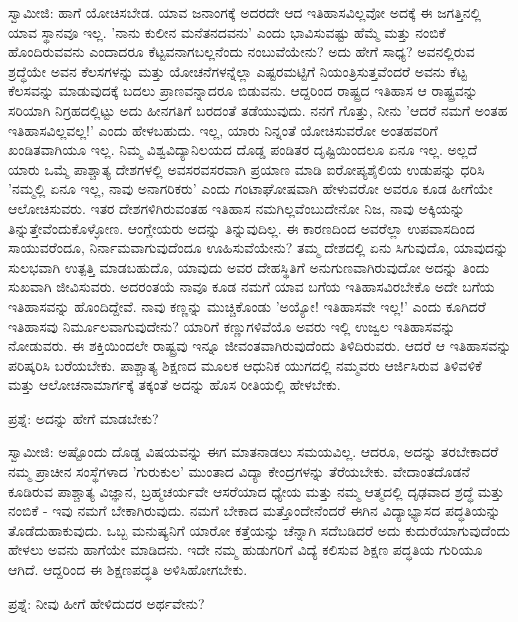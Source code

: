 ಸ್ವಾಮೀಜಿ: ಹಾಗೆ ಯೋಚಿಸಬೇಡ. ಯಾವ ಜನಾಂಗಕ್ಕೆ ಅದರದೇ ಆದ ಇತಿಹಾಸವಿಲ್ಲವೋ ಅದಕ್ಕೆ ಈ ಜಗತ್ತಿನಲ್ಲಿ ಯಾವ ಸ್ಥಾನವೂ ಇಲ್ಲ. 'ನಾನು ಕುಲೀನ ಮನೆತನದವನು' ಎಂದು ಭಾವಿಸುವಷ್ಟು ಹೆಮ್ಮೆ ಮತ್ತು ನಂಬಿಕೆ ಹೊಂದಿರುವವನು ಎಂದಾದರೂ ಕೆಟ್ಟವನಾಗಬಲ್ಲನೆಂದು ನಂಬುವೆಯೇನು? ಅದು ಹೇಗೆ ಸಾಧ್ಯ? ಅವನಲ್ಲಿರುವ ಶ್ರದ್ಧೆಯೇ ಅವನ ಕೆಲಸಗಳನ್ನು ಮತ್ತು ಯೋಚನೆಗಳನ್ನೆಲ್ಲಾ ಎಷ್ಟರಮಟ್ಟಿಗೆ ನಿಯಂತ್ರಿಸುತ್ತವೆಂದರೆ ಅವನು ಕೆಟ್ಟ ಕೆಲಸವನ್ನು ಮಾಡುವುದಕ್ಕೆ ಬದಲು ಪ್ರಾಣವನ್ನಾದರೂ ಬಿಡುವನು. ಆದ್ದರಿಂದ ರಾಷ್ಟ್ರದ ಇತಿಹಾಸ ಆ ರಾಷ್ಟ್ರವನ್ನು ಸರಿಯಾಗಿ ನಿಗ್ರಹದಲ್ಲಿಟ್ಟು ಅದು ಹೀನಗತಿಗೆ ಬರದಂತೆ ತಡೆಯುವುದು. ನನಗೆ ಗೊತ್ತು, ನೀನು 'ಆದರೆ ನಮಗೆ ಅಂತಹ ಇತಿಹಾಸವಿಲ್ಲವಲ್ಲ!' ಎಂದು ಹೇಳಬಹುದು. ಇಲ್ಲ, ಯಾರು ನಿನ್ನಂತೆ ಯೋಚಿಸುವರೋ ಅಂತಹವರಿಗೆ ಖಂಡಿತವಾಗಿಯೂ ಇಲ್ಲ. ನಿಮ್ಮ ವಿಶ್ವವಿದ್ಯಾನಿಲಯದ ದೊಡ್ಡ ಪಂಡಿತರ ದೃಷ್ಟಿಯಿಂದಲೂ ಏನೂ ಇಲ್ಲ. ಅಲ್ಲದೆ ಯಾರು ಒಮ್ಮೆ ಪಾಶ್ಚಾತ್ಯ ದೇಶಗಳಲ್ಲಿ ಅವಸರವಸರವಾಗಿ ಪ್ರಯಾಣ ಮಾಡಿ ಐರೋಪ್ಯಶೈಲಿಯ ಉಡುಪನ್ನು ಧರಿಸಿ 'ನಮ್ಮಲ್ಲಿ ಏನೂ ಇಲ್ಲ, ನಾವು ಅನಾಗರಿಕರು' ಎಂದು ಗಂಟಾಘೋಷವಾಗಿ ಹೇಳುವರೋ ಅವರೂ ಕೂಡ ಹೀಗೆಯೇ ಆಲೋಚಿಸುವರು. ಇತರ ದೇಶಗಳಿಗಿರುವಂತಹ ಇತಿಹಾಸ ನಮಗಿಲ್ಲವೆಂಬುದೇನೋ ನಿಜ, ನಾವು ಅಕ್ಕಿಯನ್ನು ತಿನ್ನುತ್ತೇವೆಂದುಕೊಳ್ಳೋಣ. ಆಂಗ್ಲೇಯರು ಅದನ್ನು ತಿನ್ನುವುದಿಲ್ಲ. ಈ ಕಾರಣದಿಂದ ಅವರೆಲ್ಲಾ ಉಪವಾಸದಿಂದ ಸಾಯುವರೆಂದೂ, ನಿರ್ನಾಮವಾಗುವುದೆಂದೂ ಊಹಿಸುವೆಯೇನು? ತಮ್ಮ ದೇಶದಲ್ಲಿ ಏನು ಸಿಗುವುದೊ, ಯಾವುದನ್ನು ಸುಲಭವಾಗಿ ಉತ್ಪತ್ತಿ ಮಾಡಬಹುದೊ, ಯಾವುದು ಅವರ ದೇಹಸ್ಥಿತಿಗೆ ಅನುಗುಣವಾಗಿರುವುದೋ ಅದನ್ನು ತಿಂದು ಸುಖವಾಗಿ ಜೀವಿಸುವರು. ಅದರಂತಯೆ ನಾವೂ ಕೂಡ ನಮಗೆ ಯಾವ ಬಗೆಯ ಇತಿಹಾಸವಿರಬೇಕೊ ಅದೇ ಬಗೆಯ ಇತಿಹಾಸವನ್ನು ಹೊಂದಿದ್ದೇವೆ. ನಾವು ಕಣ್ಣನ್ನು ಮುಚ್ಚಿಕೊಂಡು 'ಅಯ್ಯೋ! ಇತಿಹಾಸವೇ ಇಲ್ಲ!' ಎಂದು ಕೂಗಿದರೆ ಇತಿಹಾಸವು ನಿರ್ಮೂಲವಾಗುವುದೇನು? ಯಾರಿಗೆ ಕಣ್ಣುಗಳಿವೆಯೊ ಅವರು ಇಲ್ಲಿ ಉಜ್ವಲ ಇತಿಹಾಸವನ್ನು ನೋಡುವರು. ಈ ಶಕ್ತಿಯಿಂದಲೇ ರಾಷ್ಟ್ರವು ಇನ್ನೂ ಜೀವಂತವಾಗಿರುವುದೆಂದು ತಿಳಿದಿರುವರು. ಆದರೆ ಆ ಇತಿಹಾಸವನ್ನು ಪರಿಷ್ಕರಿಸಿ ಬರೆಯಬೇಕು. ಪಾಶ್ಚಾತ್ಯ ಶಿಕ್ಷಣದ ಮೂಲಕ ಆಧುನಿಕ ಯುಗದಲ್ಲಿ ನಮ್ಮವರು ಆರ್ಜಿಸಿರುವ ತಿಳಿವಳಿಕೆ ಮತ್ತು ಆಲೋಚನಾಮಾರ್ಗಕ್ಕೆ ತಕ್ಕಂತೆ ಅದನ್ನು ಹೊಸ ರೀತಿಯಲ್ಲಿ ಹೇಳಬೇಕು.

ಪ್ರಶ್ನೆ: ಅದನ್ನು ಹೇಗೆ ಮಾಡಬೇಕು?

ಸ್ವಾಮೀಜಿ: ಅಷ್ಟೊಂದು ದೊಡ್ಡ ವಿಷಯವನ್ನು ಈಗ ಮಾತನಾಡಲು ಸಮಯವಿಲ್ಲ. ಆದರೂ, ಅದನ್ನು ತರಬೇಕಾದರೆ ನಮ್ಮ ಪ್ರಾಚೀನ ಸಂಸ್ಥೆಗಳಾದ 'ಗುರುಕುಲ' ಮುಂತಾದ ವಿದ್ಯಾ ಕೇಂದ್ರಗಳನ್ನು ತೆರೆಯಬೇಕು. ವೇದಾಂತದೊಡನೆ ಕೂಡಿರುವ ಪಾಶ್ಚಾತ್ಯ ವಿಜ್ಞಾನ, ಬ್ರಹ್ಮಚರ್ಯವೇ ಆಸರೆಯಾದ ಧ್ಯೇಯ ಮತ್ತು ನಮ್ಮ ಆತ್ಮದಲ್ಲಿ ದೃಢವಾದ ಶ್ರದ್ಧೆ ಮತ್ತು ನಂಬಿಕೆ - ಇವು ನಮಗೆ ಬೇಕಾಗಿರುವುದು. ನಮಗೆ ಬೇಕಾದ ಮತ್ತೊಂದೇನೆಂದರೆ ಈಗಿನ ವಿದ್ಯಾಭ್ಯಾಸದ ಪದ್ಧತಿಯನ್ನು ತೊಡೆದುಹಾಕುವುದು. ಒಬ್ಬ ಮನುಷ್ಯನಿಗೆ ಯಾರೋ ಕತ್ತೆಯನ್ನು ಚೆನ್ನಾಗಿ ಸದೆಬಡಿದರೆ ಅದು ಕುದುರೆಯಾಗುವುದೆಂದು ಹೇಳಲು ಅವನು ಹಾಗೆಯೇ ಮಾಡಿದನು. ಇದೇ ನಮ್ಮ ಹುಡುಗರಿಗೆ ವಿದ್ಯೆ ಕಲಿಸುವ ಶಿಕ್ಷಣ ಪದ್ಧತಿಯ ಗುರಿಯೂ ಆಗಿದೆ. ಆದ್ದರಿಂದ ಈ ಶಿಕ್ಷಣಪದ್ಧತಿ ಅಳಿಸಿಹೋಗಬೇಕು.

ಪ್ರಶ್ನೆ: ನೀವು ಹೀಗೆ ಹೇಳಿದುದರ ಅರ್ಥವೇನು?

